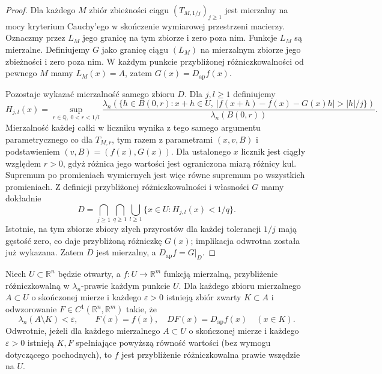 \begin{proof}
Dla każdego $M$ zbiór zbieżności ciągu
$(T_{M,1/j})_{j\ge1}$ jest mierzalny na mocy
kryterium Cauchy'ego w skończenie wymiarowej
przestrzeni macierzy. Oznaczmy przez $L_M$ jego
granicę na tym zbiorze i zero poza nim.
Funkcje $L_M$ są mierzalne. Definiujemy $G$ jako
granicę ciągu $(L_M)$ na mierzalnym zbiorze
jego zbieżności i zero poza nim. W każdym punkcie
przybliżonej różniczkowalności od pewnego $M$
mamy $L_M(x)=A$, zatem $G(x)=D_{\mathrm{ap}}f(x)$.

Pozostaje wykazać mierzalność samego zbioru $D$.
Dla $j,l\ge1$ definiujemy
\[
 H_{j,l}(x)=\sup_{r\in\mathbb Q,\ 0<r<1/l}
 \frac{\lambda_n(\{h\in B(0,r):x+h\in U,\
 |f(x+h)-f(x)-G(x)h|>|h|/j\})}
 {\lambda_n(B(0,r))}.
\]
Mierzalność każdej całki w liczniku wynika z tego
samego argumentu parametrycznego co dla $T_{M,r}$,
tym razem z parametrami $(x,v,B)$ i podstawieniem
$(v,B)=(f(x),G(x))$. Dla ustalonego $x$ licznik
jest ciągły względem $r>0$, gdyż różnica jego
wartości jest ograniczona miarą różnicy kul.
Supremum po promieniach wymiernych jest więc
równe supremum po wszystkich promieniach.
Z definicji przybliżonej różniczkowalności
i własności $G$ mamy dokładnie
\[
 D=\bigcap_{j\ge1}\bigcap_{q\ge1}
 \bigcup_{l\ge1}\{x\in U:H_{j,l}(x)<1/q\}.
\]
Istotnie, na tym zbiorze zbiory złych przyrostów
dla każdej tolerancji $1/j$ mają gęstość zero,
co daje przybliżoną różniczkę $G(x)$; implikacja
odwrotna została już wykazana. Zatem $D$ jest
mierzalny, a $D_{\mathrm{ap}}f=G|_D$.
\end{proof}

\begin{twierdzenie}
\label{thm:dzety-whitney-lusin}
Niech $U\subset\mathbb R^n$ będzie otwarty,
a $f:U\to\mathbb R^m$ funkcją mierzalną,
przybliżenie różniczkowalną w $\lambda_n$-prawie każdym
punkcie $U$. Dla każdego zbioru mierzalnego $A\subset U$
o skończonej mierze i każdego $\varepsilon>0$ istnieją
zbiór zwarty $K\subset A$ i odwzorowanie
$F\in C^1(\mathbb R^n,\mathbb R^m)$ takie, że
\[
 \lambda_n(A\setminus K)<\varepsilon,
 \qquad F(x)=f(x),\quad DF(x)=D_{\mathrm{ap}}f(x)
 \quad (x\in K).
\]
Odwrotnie, jeżeli dla każdego mierzalnego $A\subset U$
o skończonej mierze i każdego $\varepsilon>0$ istnieją
$K,F$ spełniające powyższą równość wartości (bez wymogu
dotyczącego pochodnych), to $f$ jest przybliżenie
różniczkowalna prawie wszędzie na $U$.
\end{twierdzenie}

